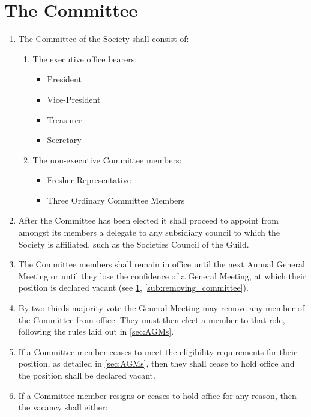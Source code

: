 \documentclass[a4paper]{article}
\begin{document}
\section{The Committee} \label{sec:committee}
\begin{enumerate}
	\item The Committee of the Society shall consist of:
    \begin{enumerate}
    	\item The executive office bearers:
        \begin{itemize}
          \item President
          \item Vice-President
          \item Treasurer
          \item Secretary 
        \end{itemize}
        \item The non-executive Committee members:
        \begin{itemize}
            \item Fresher Representative
        	\item Three Ordinary Committee Members
        \end{itemize}
    \end{enumerate}
    \item After the Committee has been elected it shall proceed to appoint from amongst its members a delegate to any subsidiary council to which the Society is affiliated, such as the Societies Council of the Guild.
    \item The Committee members shall remain in office until the next Annual General Meeting or until they lose the confidence of a General Meeting, at which their position is declared vacant (see \cref{sec:committee}, \cref{sub:removing_committee}).
    \item \label{sub:removing_committee} By two-thirds majority vote the General Meeting may remove any member of the Committee from office. They must then elect a member to that role, following the rules laid out in \cref{sec:AGMs}.
    \item If a Committee member ceases to meet the eligibility requirements for their position, as detailed in \cref{sec:AGMs}, then they shall cease to hold office and the position shall be declared vacant.
    \item \label{sub:committee_resign} If a Committee member resigns or ceases to hold office for any reason, then the vacancy shall either:
    \begin{enumerate}

\end{enumerate}
\end{enumerate}
\end{document}
